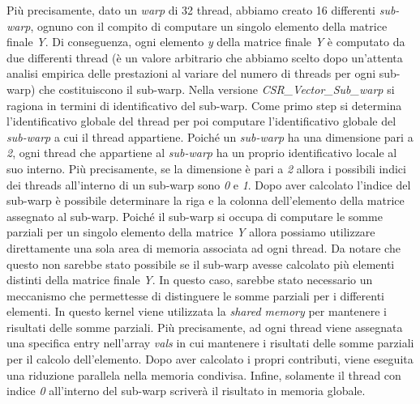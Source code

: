 \documentclass{article}
\begin{document}
Più precisamente, dato un \textit{warp} di 32 thread, abbiamo creato 16 differenti \textit{sub-warp}, ognuno con il compito di computare un singolo elemento della matrice finale \textit{Y}. Di conseguenza, ogni elemento \textit{y} della matrice finale \textit{Y} è computato da due differenti thread (è un valore arbitrario che abbiamo scelto dopo un'attenta analisi empirica delle prestazioni al variare del numero di threads per ogni sub-warp) che costituiscono il sub-warp. Nella versione \textit{CSR\_Vector\_Sub\_warp} si ragiona in termini di identificativo del sub-warp. Come primo step si determina l'identificativo globale del thread per poi computare l'identificativo globale del \textit{sub-warp} a cui il thread appartiene. Poiché un \textit{sub-warp} ha una dimensione pari a \textit{2}, ogni thread che appartiene al \textit{sub-warp} ha un proprio identificativo locale al suo interno. Più precisamente, se la dimensione è pari a \textit{2} allora i possibili indici dei threads all'interno di un sub-warp sono \textit{0} e \textit{1}. Dopo aver calcolato l'indice del sub-warp è possibile determinare la riga e la colonna dell'elemento della matrice assegnato al sub-warp. Poiché il sub-warp si occupa di computare le somme parziali per un singolo elemento della matrice \textit{Y} allora possiamo utilizzare direttamente una sola area di memoria associata ad ogni thread. Da notare che questo non sarebbe stato possibile se il sub-warp avesse calcolato più elementi distinti della matrice finale \textit{Y}. In questo caso, sarebbe stato necessario un meccanismo che permettesse di distinguere le somme parziali per i differenti elementi. In questo kernel viene utilizzata la \textit{shared memory} per mantenere i risultati delle somme parziali. Più precisamente, ad ogni thread viene assegnata una specifica entry nell'array \textit{vals} in cui mantenere i risultati delle somme parziali per il calcolo dell'elemento. Dopo aver calcolato i propri contributi, viene eseguita una riduzione parallela nella memoria condivisa. Infine, solamente il thread con indice \textit{0} all'interno del sub-warp scriverà il risultato in memoria globale. \\
\end{document}
